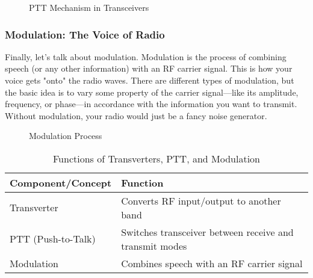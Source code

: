 \begin{figure}[h!]
    \centering
    \caption{PTT Mechanism in Transceivers}
    \label{fig:ptt-diagram}
\end{figure}

\subsubsection*{Modulation: The Voice of Radio}
Finally, let's talk about modulation. Modulation is the process of combining speech (or any other information) with an RF carrier signal. This is how your voice gets "onto" the radio waves. There are different types of modulation, but the basic idea is to vary some property of the carrier signal—like its amplitude, frequency, or phase—in accordance with the information you want to transmit. Without modulation, your radio would just be a fancy noise generator.

\begin{figure}[h!]
    \centering
    \caption{Modulation Process}
    \label{fig:modulation-diagram}
\end{figure}

\begin{table}[h!]
    \centering
    \caption{Functions of Transverters, PTT, and Modulation}
    \label{tab:transverter-ptt-modulation}
    \begin{tabular}{|l|l|}
        \hline
        \textbf{Component/Concept} & \textbf{Function} \\
        \hline
        Transverter & Converts RF input/output to another band \\
        PTT (Push-to-Talk) & Switches transceiver between receive and transmit modes \\
        Modulation & Combines speech with an RF carrier signal \\
        \hline
    \end{tabular}
\end{table}

